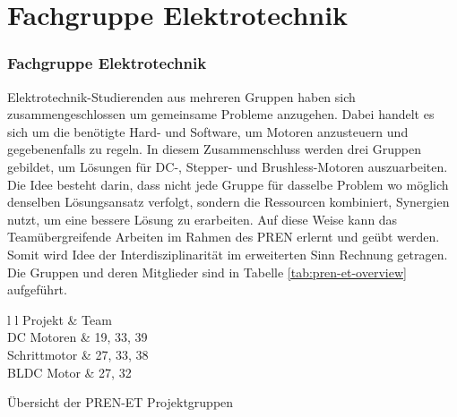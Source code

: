 \ifSTANDALONE
\section{Fachgruppe Elektrotechnik}
\fi
\ifEMBED
\subsubsection{Fachgruppe Elektrotechnik}
\label{chap:Fachgruppe Elektrotechnik}
\fi
Elektrotechnik-Studierenden aus mehreren Gruppen haben sich
zusammengeschlossen um gemeinsame Probleme anzugehen. Dabei handelt es sich
um die benötigte Hard- und Software, um Motoren anzusteuern
und gegebenenfalls zu regeln. In diesem Zusammenschluss werden drei Gruppen
gebildet, um Lösungen für DC-, Stepper- und Brushless-Motoren auszuarbeiten.
Die Idee besteht darin, dass nicht jede Gruppe für dasselbe Problem wo
möglich denselben Lösungsansatz verfolgt, sondern die Ressourcen kombiniert,
Synergien nutzt, um eine bessere Lösung zu erarbeiten. Auf diese Weise kann
das Teamübergreifende Arbeiten im Rahmen des PREN erlernt und
geübt werden. Somit wird Idee der Interdisziplinarität im erweiterten Sinn
Rechnung getragen. Die Gruppen und deren Mitglieder sind in Tabelle 
\ref{tab:pren-et-overview} aufgeführt.
\begin{table}[h!]
	\centering
	\begin{zebratabular}{l l}
		 Projekt		& Team \\
		DC Motoren   & 19, 33, 39 \\
		Schrittmotor & 27, 33, 38 \\
		BLDC Motor   & 27, 32 \\
	\end{zebratabular}
	\caption{Übersicht der PREN-ET Projektgruppen}
	\label{tab:pren-et-overview}
\end{table}
